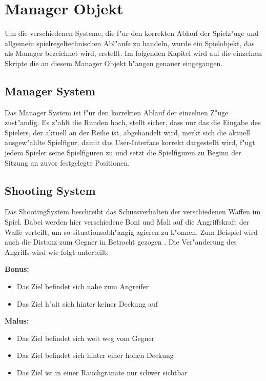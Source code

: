 \chapter{Manager Objekt}

Um die verschiedenen Systeme, die f"ur den korrekten Ablauf der Spielz"uge und allgemein spielregeltechnischen Abl"aufe zu handeln, wurde ein Spielobjekt, das als Manager bezeichnet wird, erstellt. Im folgenden Kapitel wird auf die einzelnen Skripte die an diesem Manager Objekt h"angen genauer eingegangen. 

\section{Manager System}

Das Manager System ist f"ur den korrekten Ablauf der einzelnen Z"uge zust"andig. Es z"ahlt die Runden hoch, stellt sicher, dass nur das die Eingabe des Spielers, der aktuell an der Reihe ist, abgehandelt wird, merkt sich die aktuell ausgew"ahlte Spielfigur, damit das User-Interface korrekt dargestellt wird, f"ugt jedem Spieler seine Spielfiguren zu und setzt die Spielfiguren zu Beginn der Sitzung an zuvor festgelegte Positionen.

\section{Shooting System}

Das ShootingSystem beschreibt das Schussverhalten der verschiedenen Waffen im Spiel. Dabei werden hier verschiedene Boni und Mali auf die Angriffskraft der Waffe verteilt, um so situationsabh"angig agieren zu k"onnen. Zum Beispiel wird auch die Distanz zum Gegner in Betracht gezogen . Die Ver"anderung des Angriffs wird wie folgt unterteilt:\newline

\textbf{Bonus:}
\begin{itemize}
	\item Das Ziel befindet sich nahe zum Angreifer
	\item Das Ziel h"alt sich hinter keiner Deckung auf
\end{itemize}

	\textbf{Malus:}
\begin{itemize}
	\item Das Ziel befindet sich weit weg vom Gegner
	\item Das Ziel befindet sich hinter einer hohen Deckung
	\item Das Ziel ist in einer Rauchgranate nur schwer sichtbar	
\end{itemize}

